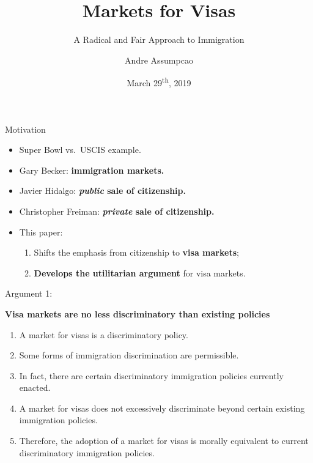 \documentclass[10pt,ignorenonframetext,]{beamer}
\title{Markets for Visas}
\subtitle{A Radical and Fair Approach to Immigration}
\author{Andre Assumpcao}
\institute{UNC-Chapel Hill}
\date{March 29\textsuperscript{th}, 2019}
\begin{document}
\frame{\titlepage}

\begin{frame}{Motivation}
\protect\hypertarget{motivation}{}

\begin{itemize}
\item
  Super Bowl vs.~USCIS example.\\
\item
  Gary Becker: \textbf{immigration markets.}\\
\item
  Javier Hidalgo: \textbf{\emph{public} sale of citizenship.}\\
\item
  Christopher Freiman: \textbf{\emph{private} sale of citizenship.}\\
\item
  This paper: \bigskip

  \begin{enumerate}
  \item
    Shifts the emphasis from citizenship to \textbf{visa markets};
  \item
    \textbf{Develops the utilitarian argument} for visa markets.
  \end{enumerate}
\end{itemize}

\end{frame}

\begin{frame}{Argument 1:}
\protect\hypertarget{arg1}{}

\textbf{Visa markets are no less discriminatory than existing policies}

\bigskip

\begin{enumerate}
\item
  A market for visas is a discriminatory policy.\\
\item
  Some forms of immigration discrimination are permissible.\\
\item
  In fact, there are certain discriminatory immigration policies
  currently enacted.\\
\item
  A market for visas does not excessively discriminate beyond certain
  existing immigration policies.\\
\item
  Therefore, the adoption of a market for visas is morally equivalent to
  current discriminatory immigration policies.
\end{enumerate}

\end{frame}
\end{document}

